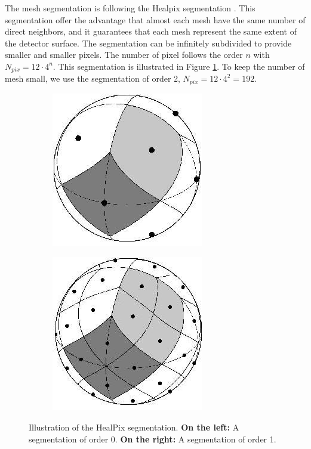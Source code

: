 \documentclass[../main.tex]{subfiles}
\begin{document}
The mesh segmentation is following the Healpix segmentation \cite{gorski_healpix_2005}. This segmentation offer the advantage that almost each mesh have the same number of direct neighbors, and it guarantees that each mesh represent the same extent of the detector surface. The segmentation can be infinitely subdivided to provide smaller and smaller pixels. The number of pixel follows the order $n$ with $N_{pix} = 12 \cdot 4^n$. This segmentation is illustrated in Figure \ref{fig:jgnn:healpix}. To keep the number of mesh small, we use the segmentation of order 2, $N_{pix} = 12 \cdot 4^2 = 192$.

\begin{figure}
  \centering
  \begin{subfigure}[t]{0.48\linewidth}
    \centering
    \includegraphics[width=0.5\linewidth]{images/jgnn/healpix_0.jpg}
  \end{subfigure}
  \hfill
  \begin{subfigure}[t]{0.48\linewidth}
    \centering
    \includegraphics[width=0.5\linewidth]{images/jgnn/healpix_1.jpg}
  \end{subfigure}
  \caption{Illustration of the HealPix segmentation. \textbf{On the left:} A segmentation of order 0. \textbf{On the right:} A segmentation of order 1.}
  \label{fig:jgnn:healpix}
\end{figure}
\end{document}
